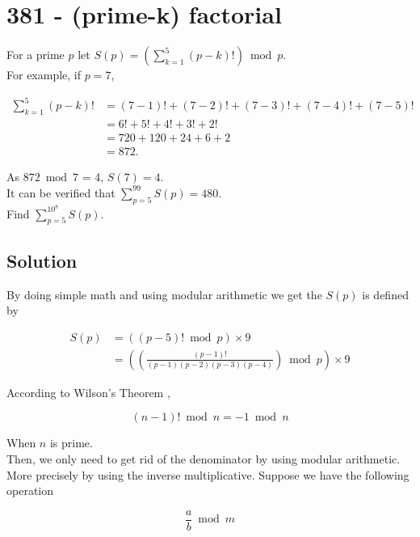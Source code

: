 \chapter*{381 - (prime-k) factorial}

   

For a prime $p$ let $S(p) = \left ( \sum_{k=1}^5(p-k)! \right ) \bmod{p}$.\\

For example, if $p=7$,

\begin{align*}
    \sum_{k=1}^5(p-k)! &= (7-1)! + (7-2)! + (7-3)! + (7-4)! + (7-5)!\\
    &= 6! + 5! + 4! + 3! + 2!\\
    &= 720+120+24+6+2\\
    &= 872.
\end{align*}


As $872 \bmod{7}$ = 4, $S(7) = 4$.\\

It can be verified that $\sum_{p=5}^{99} S(p) = 480$.\\

Find $\sum_{p=5}^{10^8} S(p)$.

\section*{Solution}

By doing simple math and using modular arithmetic we get the $S(p)$ is defined by

\begin{align*}
    S(p) &= \left ( (p-5)! \bmod p \right ) \times 9 \\
    &= \left ( \left ( \frac{(p-1)!}{(p-1)(p-2)(p-3)(p-4)} \right ) \bmod p \right ) \times 9
\end{align*}

According to Wilson's Theorem \cite{wilson_theorem},

$$
(n-1)! \bmod n = -1 \bmod n
$$

When $n$ is prime.\\

Then, we only need to get rid of the denominator by using modular arithmetic. More precisely by using the inverse multiplicative. Suppose we have the following operation

$$
\frac{a}{b} \bmod m
$$

